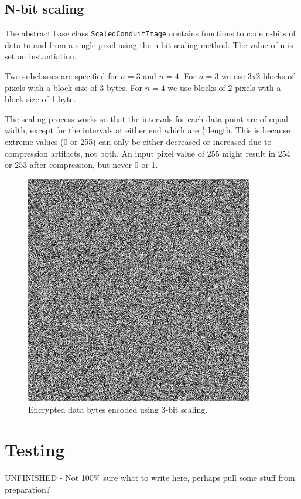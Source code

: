 \FloatBarrier
\subsection{N-bit scaling}

The abstract base class {\tt ScaledConduitImage} contains functions to code n-bits of data to and from a single pixel using the n-bit scaling method. The value of n is set on instantiation.

Two subclasses are specified for $n=3$ and $n=4$. For $n=3$ we use 3x2 blocks of pixels with a block size of 3-bytes. For $n=4$ we use blocks of 2 pixels with a block size of 1-byte.

The scaling process works so that the intervals for each data point are of equal width, except for the intervals at either end which are $\frac{1}{2}$ length. This is because extreme values (0 or 255) can only be either decreased or increased due to compression artifacts, not both. An input pixel value of 255 might result in 254 or 253 after compression, but never 0 or 1.



    \begin{figure}[tbph]
        \begin{center}
                \includegraphics[width=10cm]{screens/scaled.jpg}
            \caption{Encrypted data bytes encoded using 3-bit scaling.}
            \label{scn:haar}
        \end{center}
    \end{figure}

\FloatBarrier
\section{Testing}

UNFINISHED - Not 100\% sure what to write here, perhaps pull some stuff from preparation?